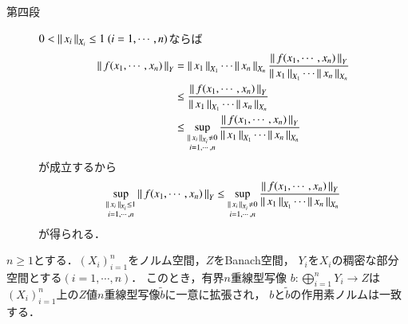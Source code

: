 \begin{prf}
\begin{description}
			\item[第四段]
				$0 < \Norm{x_i}{X_i} \leq 1\ (i=1,\cdots,n)$ならば
				\begin{align}
					\left\|\, f(x_1,\cdots,x_n)\, \right\|_{Y}
					&= \left\|\, x_1\, \right\|_{X_1} \cdots \left\|\, x_n\, \right\|_{X_n} \frac{\left\|\, f(x_1,\cdots,x_n)\, \right\|_{Y}}{\left\|\, x_1\, \right\|_{X_1} \cdots \left\|\, x_n\, \right\|_{X_n}} \\
					&\leq \frac{\left\|\, f(x_1,\cdots,x_n)\, \right\|_{Y}}{\left\|\, x_1\, \right\|_{X_1} \cdots \left\|\, x_n\, \right\|_{X_n}} \\
					&\leq \operatorname*{sup}_{\substack{\left\|\, x_i\, \right\|_{X_i} \neq 0 \\ i=1,\cdots,n}} 
					\frac{\left\|\, f(x_1,\cdots,x_n)\, \right\|_{Y}}{\left\|\, x_1\, \right\|_{X_1} \cdots \left\|\, x_n\, \right\|_{X_n}}
				\end{align}
				が成立するから
				\begin{align}
					\operatorname*{sup}_{\substack{\left\|\, x_i\, \right\|_{X_i} \leq 1 \\ i=1,\cdots,n}} \left\|\, f(x_1,\cdots,x_n)\, \right\|_{Y}
					\leq \operatorname*{sup}_{\substack{\left\|\, x_i\, \right\|_{X_i} \neq 0 \\ i=1,\cdots,n}} 
					\frac{\left\|\, f(x_1,\cdots,x_n)\, \right\|_{Y}}{\left\|\, x_1\, \right\|_{X_1} \cdots \left\|\, x_n\, \right\|_{X_n}}
				\end{align}
				が得られる．
				\QED
		\end{description}
	\end{prf}
	
	\begin{screen}
		\begin{thm}[有界な多重線型写像の一意拡張]\label{thm:expansion_of_multilinear_mapping}
			$n \geq 1$とする．$(X_i)_{i=1}^{n}$をノルム空間，$Z$をBanach空間，
			$Y_i$を$X_i$の稠密な部分空間とする$(i=1,\cdots,n)$．
			このとき，有界$n$重線型写像
			$b:\bigoplus_{i=1}^n Y_i \longrightarrow Z$は
			$(X_i)_{i=1}^{n}$上の$Z$値$n$重線型写像$\tilde{b}$に一意に拡張され，
			$b$と$\tilde{b}$の作用素ノルムは一致する．
		\end{thm}
	\end{screen}
	

